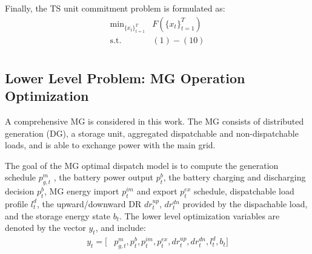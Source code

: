 Finally, the TS unit commitment problem is formulated as: 
\begin{subequations}
\begin{align}
\text{min}_{\{x_t\}^{T}_{t=1}} & F\left(\{x_t\}^{T}_{t=1}\right)\nonumber\\
\text{s.t.   } & (1)-(10)\nonumber\\
\end{align}
\end{subequations}

\subsection{Lower Level Problem: MG Operation Optimization}
A comprehensive MG is considered in this work. The MG consists of distributed generation (DG), a storage unit, aggregated dispatchable and non-dispatchable loads, and is able to exchange power with the main grid. 


The goal of the MG optimal dispatch model is to compute the generation schedule $p^m_{g,t}$ , the battery power output $p^b_{t}$, the battery charging and discharging decision $p^b_t$, MG energy import $p^{im}_{t}$ and export $p^{ex}_{t}$ schedule, dispatchable load profile $l^d_{t}$, the upward/downward  DR $dr_{t}^{up}$, $dr_{t}^{dn}$ provided by the dispachable load, and the storage energy state $b_t$. The lower level optimization variables are denoted by the vector $y_t$, and include:
\begin{align*}
y_t=[&p^m_{g,t}, p^b_{t}, p^{im}_{t}, p^{ex}_{t},dr_{t}^{up},dr_{t}^{dn},l^d_{t}, b_t]
\end{align*} 

